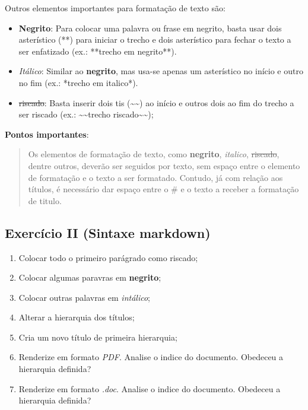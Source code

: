 \documentclass[]{book}
\providecommand{\tightlist}{%
  \setlength{\itemsep}{0pt}\setlength{\parskip}{0pt}}
\begin{document}
Outros elementos importantes para formatação de texto são:

\begin{itemize}
\tightlist
\item
  \textbf{Negrito}: Para colocar uma palavra ou frase em negrito, basta usar dois asterístico (**) para iniciar o trecho e dois asterístico para fechar o texto a ser enfatizado (ex.: **trecho em negrito**).\\
\item
  \emph{Itálico}: Similar ao \textbf{negrito}, mas usa-se apenas um asterístico no início e outro no fim (ex.: *trecho em italico*).\\
\item
  \sout{riscado}: Basta inserir dois tis (\textasciitilde{}\textasciitilde{}) ao início e outros dois ao fim do trecho a ser riscado (ex.: \textasciitilde{}\textasciitilde{}trecho riscado\textasciitilde{}\textasciitilde{});
\end{itemize}

\textbf{Pontos importantes}:

\begin{quote}
Os elementos de formatação de texto, como \textbf{negrito}, \emph{italico}, \sout{riscado}, dentre outros, deverão ser seguidos por texto, sem espaço entre o elemento de formatação e o texto a ser formatado. Contudo, já com relação aos títulos, é necessário dar espaço entre o \# e o texto a receber a formatação de titulo.
\end{quote}

\hypertarget{exercuxedcio-ii-sintaxe-markdown}{%
\subsection{Exercício II (Sintaxe markdown)}\label{exercuxedcio-ii-sintaxe-markdown}}

\begin{enumerate}
\def\labelenumi{\arabic{enumi}.}
\tightlist
\item
  Colocar todo o primeiro parágrado como riscado;
\item
  Colocar algumas paravras em \textbf{negrito};\\
\item
  Colocar outras palavras em \emph{intálico};\\
\item
  Alterar a hierarquia dos títulos;\\
\item
  Cria um novo título de primeira hierarquia;\\
\item
  Renderize em formato \emph{PDF}. Analise o indice do documento. Obedeceu a hierarquia definida?\\
\item
  Renderize em formato \emph{.doc}. Analise o indice do documento. Obedeceu a hierarquia definida?
\end{enumerate}
\end{document}
